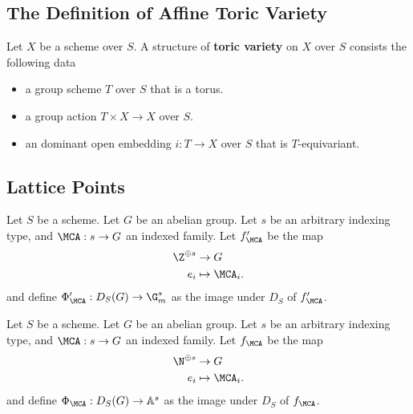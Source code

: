 \subsection{The Definition of Affine Toric Variety}


\begin{definition}
  \label{1-1-3-tor-var}
  \leanok
  Let $X$ be a scheme over $S$. A structure of {\bf toric variety} on $X$ over $S$ consists the following data
  \begin{itemize}
    \item a group scheme $T$ over $S$ that is a torus.
    \item a group action $T \times X \to X$ over $S$.
    \item an dominant open embedding $i : T \to X$ over $S$ that is $T$-equivariant.
  \end{itemize}
\end{definition}


\subsection{Lattice Points}


\begin{definition}
  \label{1-1-phiAprime}

  Let $S$ be a scheme. Let $G$ be an abelian group.
  Let $s$ be an arbitrary indexing type, and $\MCA : s \to G$ an indexed family.
  Let $f'_\MCA$ be the map
  \begin{align*}
    \Z^{\oplus s} & \to G \\
    e_i & \mapsto \MCA_i.
  \end{align*}
  and define $\Phi'_\MCA : D_S(G) \to \G_m^s$ as the image under $D_S$ of $f'_\MCA$.
\end{definition}


\begin{definition}
  \label{1-1-phiA}

  Let $S$ be a scheme. Let $G$ be an abelian group.
  Let $s$ be an arbitrary indexing type, and $\MCA : s \to G$ an indexed family.
  Let $f_\MCA$ be the map
  \begin{align*}
    \N^{\oplus s} & \to G \\
    e_i & \mapsto \MCA_i.
  \end{align*}
  and define $\Phi_\MCA : D_S(G) \to \mathbb A^s$ as the image under $D_S$ of $f_\MCA$.
\end{definition}


